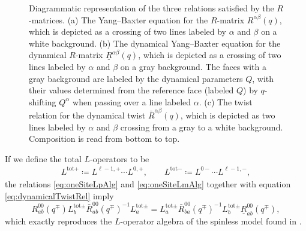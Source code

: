 \begin{figure}[t]
\begin{subfigure}{0.32\textwidth}
    \caption{}
    \end{subfigure}
    \caption[Diagrams of the $R$-matrix relations.]{Diagrammatic representation of the three relations satisfied by the $R$-matrices. (a) The Yang--Baxter equation for the $R$-matrix $R^{\alpha\beta}(q)$, which is depicted as a crossing of two lines labeled by $\alpha$ and $\beta$ on a white background. (b) The dynamical Yang--Baxter equation for the dynamical $R$-matrix $\underline R^{\alpha\beta}(q)$, which is depicted as a crossing of two lines labeled by $\alpha$ and $\beta$ on a gray background. The faces with a gray background are labeled by the dynamical parameters $Q$, with their values determined from the reference face (labeled $Q$) by $q$-shifting $Q^\alpha$ when passing over a line labeled $\alpha$. (c) The twist relation for the dynamical twist $\bar R^{\alpha\beta}(q)$, which is depicted as two lines labeled by $\alpha$ and $\beta$ crossing from a gray to a white background. Composition is read from bottom to top.}
    \label{fig:Rmatrelations}
\end{figure}

If we define the total $L$-operators to be
\begin{align}
    L^{\text{tot}+} \coloneq L^{\ell-1,+} \cdots L^{0,+}, \qquad L^{\text{tot}-} \coloneq L^{0-} \cdots L^{\ell-1,-},
\end{align}
the relations \eqref{eq:oneSiteLpAlg} and \eqref{eq:oneSiteLmAlg} together with equation \eqref{eq:dynamicalTwistRel} imply
\begin{equation}\label{eq:totalAlg}
    R_{ab}^{00}(q^{\mp}) L_b^{\text{tot}\pm} \bar R_{ab}^{00}(q^{\mp})^{-1} L_a^{\text{tot}\pm} = L_a^{\text{tot}\pm} \bar R_{ba}^{00}(q^{\mp})^{-1} L_b^{\text{tot}\pm} \underline R_{ab}^{00}(q^{\mp}),
\end{equation}
which exactly reproduces the $L$-operator algebra of the spinless model found in \cite{arutyunov_quantum_2019}.

